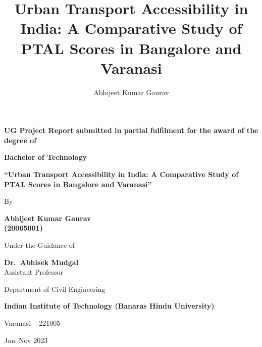 \documentclass[11pt]{article}
\title{Urban Transport Accessibility in India: A Comparative Study of PTAL Scores in Bangalore and Varanasi}
\author{Abhijeet Kumar Gaurav}
\date{}
\begin{document}
\begin{titlepage}
  \centering
  \vspace*{0.3cm}
  {\large\bfseries UG Project Report submitted in partial fulfilment for the award of the degree of}\par
  \vspace{0.2cm}
  {\large\bfseries Bachelor of Technology}\par
  \vspace{1cm}
  {\Huge\bfseries ``Urban Transport Accessibility in India: A Comparative Study of PTAL Scores in Bangalore and Varanasi''}\par
  \vspace{1.5cm}
  By\par
  \vspace{0.2cm}
  {\bfseries Abhijeet Kumar Gaurav \\ (20065001)}\par
  \vspace{0.8cm}
  Under the Guidance of\par
  \vspace{0.2cm}
  {\bfseries Dr.\ Abhisek Mudgal} \\ Assistant Professor\par
  \vspace{1.2cm}
  \par
  \vspace{1cm}
  Department of Civil Engineering\par
  \textbf{Indian Institute of Technology (Banaras Hindu University)}\par
  Varanasi -- 221005\par
  \vspace{0.3cm}
  Jan--Nov 2023\par
\end{titlepage}

\end{document}
